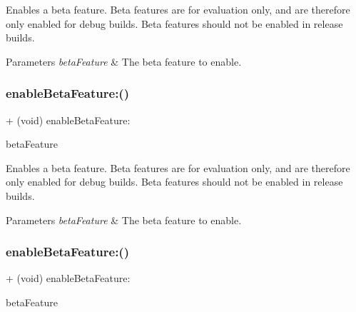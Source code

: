 Enables a beta feature. Beta features are for evaluation only, and are therefore only enabled for debug builds. Beta features should not be enabled in release builds.


\begin{DoxyParams}{Parameters}
{\em beta\+Feature} & The beta feature to enable. \\
\hline
\end{DoxyParams}
\mbox{\label{interfaceFBSettings_a390b436e1de87f3d49979a6aa98e14b1}} 
\subsubsection{\texorpdfstring{enable\+Beta\+Feature\+:()}{enableBetaFeature:()}\hspace{0.1cm}{\footnotesize\ttfamily [2/5]}}
{\footnotesize\ttfamily + (void) enable\+Beta\+Feature\+: \begin{DoxyParamCaption}\item[{(F\+B\+Beta\+Features)}]{beta\+Feature }\end{DoxyParamCaption}}

Enables a beta feature. Beta features are for evaluation only, and are therefore only enabled for debug builds. Beta features should not be enabled in release builds.


\begin{DoxyParams}{Parameters}
{\em beta\+Feature} & The beta feature to enable. \\
\hline
\end{DoxyParams}
\mbox{\label{interfaceFBSettings_a390b436e1de87f3d49979a6aa98e14b1}} 
\subsubsection{\texorpdfstring{enable\+Beta\+Feature\+:()}{enableBetaFeature:()}\hspace{0.1cm}{\footnotesize\ttfamily [3/5]}}
{\footnotesize\ttfamily + (void) enable\+Beta\+Feature\+: \begin{DoxyParamCaption}\item[{(F\+B\+Beta\+Features)}]{beta\+Feature }\end{DoxyParamCaption}}

